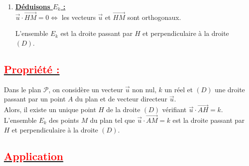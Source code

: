 \documentclass[12pt,a4paper]{article}
\begin{document}
\begin{enumerate}
M $\in E_k \iff \vec{u} \cdot \overrightarrow{AM} = k$ \\
H $\in E_k \iff \vec{u} \cdot \overrightarrow{AH} = k$\\

    Donc $\|\vec{u}\| \times \|\overrightarrow{AH}\| \times (-1) = k \iff AH = -\frac{k}{\|\vec{u}\|}$

\item \textbf{\underline{Déduisons $E_k$ :}} \\
    $\vec{u} \cdot \overrightarrow{HM} = 0 \iff$ les vecteurs $\vec{u}$ et $\overrightarrow{HM}$ sont orthogonaux.

L'ensemble $E_k$ est la droite passant par $H$ et perpendiculaire à la droite $(D)$.

\vspace{0.5cm}

\begin{center}
\end{center}
\end{enumerate}

\subsection*{\underline{\textbf{\textcolor{red}{Propriété :}}}}

Dans le plan $\mathcal{P}$, on considère un vecteur $\vec{u}$ non nul, $k$ un réel et $(D)$ une droite passant par un point $A$ du plan et de vecteur directeur $\vec{u}$. \\
Alors, il existe un unique point $H$ de la droite $(D)$ vérifiant $\vec{u} \cdot \overrightarrow{AH} = k$. \\
L'ensemble $E_k$ des points $M$ du plan tel que $\vec{u} \cdot \overrightarrow{AM} = k$ est la droite passant par $H$ et perpendiculaire à la droite $(D)$.

\vspace{0.5cm}

\subsection*{\underline{\textbf{\textcolor{red}{Application}}}}
\end{document}
